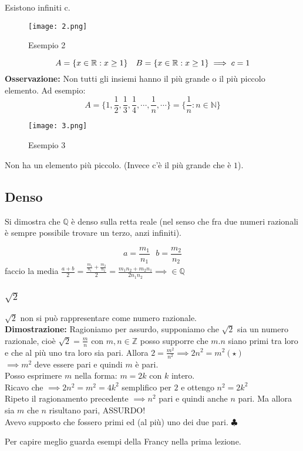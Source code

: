 \documentclass[../../main.tex]{subfiles}
\begin{document}
Esistono infiniti c.

\begin{figure}[!ht]
    \centering
    \texttt{[image: 2.png]}
    \caption{Esempio 2}
    \label{fig:2}
\end{figure}
\[
    A = \{x \in \mathbb{R} : x \geq 1\} \ \ \ B = \{x \in \mathbb{R} : x \geq 1\} \implies c = 1
\]
\textbf{Osservazione:} Non tutti gli insiemi hanno il più grande o il più piccolo elemento. Ad esempio:
\[
    A = \{1, \frac{1}{2}, \frac{1}{3}, \frac{1}{4}, \cdots, \frac{1}{n}, \cdots\} = \{\frac{1}{n} : n\in \mathbb{N}\}
\]
\begin{figure}[h]
    \centering
    \texttt{[image: 3.png]}
    \caption{Esempio 3}
    \label{fig:3}
\end{figure}

Non ha un elemento più piccolo. (Invece c'è il più grande che è $1$).

\subsection{Denso}
Si dimostra che $\mathbb{Q}$ è denso sulla retta reale (nel senso che fra due
numeri razionali è sempre possibile trovare un terzo, anzi infiniti).

\[
    a = \frac{m_1}{n_1} \ \ \ b = \frac{m_2}{n_2}
\]
faccio la media $\frac{a+b}{2} =\frac{\frac{m_1}{n_1} + \frac{m_2}{n_2}}{2} =
    \frac{m_1n_2 + m_2n_1}{2n_1n_2} \implies \in \mathbb{Q}$

\subsubsection{$\sqrt{2}$}
$\sqrt{2}$ non si può rappresentare come numero razionale.\\
\textbf{Dimostrazione:} Ragioniamo per assurdo, supponiamo che $\sqrt{2}$ sia un numero razionale, cioè $\sqrt{2} = \frac{m}{n}$ con $m,n \in \mathbb{Z}$ posso supporre che $m. n$ siano primi tra loro e che al più uno tra loro sia pari.
Allora $2 = \frac{m^2}{n^2} \implies  2n^2 = m^2 (\star)$\\
$\implies m^2$ deve essere pari e quindi $m$ è pari.\\
Posso esprimere $m$ nella forma: $m = 2k$ con $k$ intero.\\
Ricavo che $\implies 2n^2 = m^2 = 4k^2$ semplifico per $2$ e ottengo $n^2 = 2k^2$\\
Ripeto il ragionamento precedente $\implies n^2$ pari e quindi anche $n$ pari. Ma allora sia $m$ che $n$ risultano pari, ASSURDO!\\
Avevo supposto che fossero primi ed (al più) uno dei due pari. $\clubsuit$

Per capire meglio guarda esempi della Francy nella prima lezione.
\end{document}

